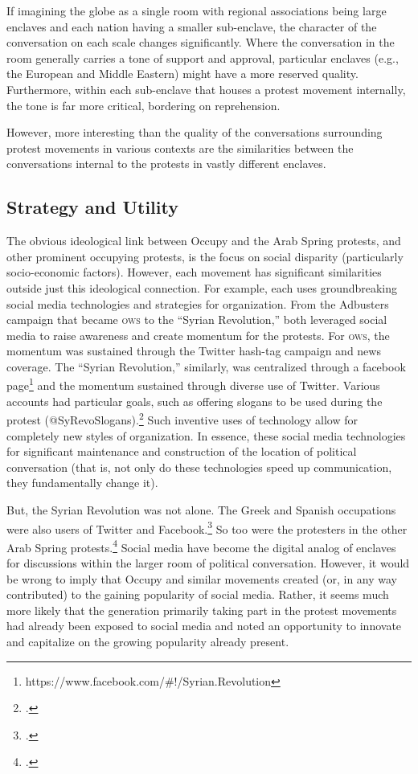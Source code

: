 \documentclass[openany,twoside]{memoir}
\begin{document}
\begin{Spacing}{2}
If imagining the globe as a single room with regional associations being large enclaves and each nation having a smaller sub-enclave, the character of the conversation on each scale changes significantly.
Where the conversation in the room generally carries a tone of support and approval, particular enclaves (e.g., the European and Middle Eastern) might have a more reserved quality.
Furthermore, within each sub-enclave that houses a protest movement internally, the tone is far more critical, bordering on reprehension.

However, more interesting than the quality of the conversations surrounding protest movements in various contexts are the similarities between the conversations internal to the protests in vastly different enclaves.

\subsection{Strategy and Utility}
The obvious ideological link between Occupy and the Arab Spring protests, and other prominent occupying protests, is the focus on social disparity (particularly socio-economic factors).
However, each movement has significant similarities outside just this ideological connection.
For example, each uses groundbreaking social media technologies and strategies for organization.
From the Adbusters campaign that became \textsc{ows} to the ``Syrian Revolution,'' both leveraged social media to raise awareness and create momentum for the protests.
For \textsc{ows}, the momentum was sustained through the Twitter hash-tag campaign and news coverage.
The ``Syrian Revolution,'' similarly, was centralized through a facebook page\footnote{https://www.facebook.com/\#!/Syrian.Revolution} and the momentum sustained through diverse use of Twitter.
Various accounts had particular goals, such as offering slogans to be used during the protest (@SyRevoSlogans).\footcite{ghattas11}
Such inventive uses of technology allow for completely new styles of organization.
In essence, these social media technologies for significant maintenance and construction of the location of political conversation (that is, not only do these technologies speed up communication, they fundamentally change it).

But, the Syrian Revolution was not alone.
The Greek and Spanish occupations were also users of Twitter and Facebook.\footcite{theocharis13}
So too were the protesters in the other Arab Spring protests.\footcite{huang11}
Social media have become the digital analog of enclaves for discussions within the larger room of political conversation.
However, it would be wrong to imply that Occupy and similar movements created (or, in any way contributed) to the gaining popularity of social media.
Rather, it seems much more likely that the generation primarily taking part in the protest movements had already been exposed to social media and noted an opportunity to innovate and capitalize on the growing popularity already present.


\end{Spacing}
\end{document}
